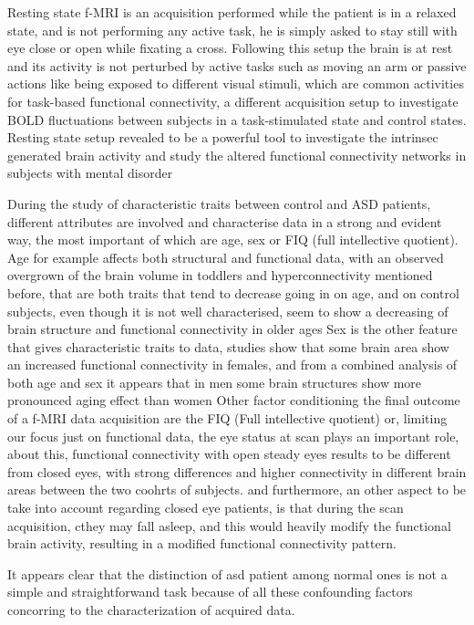 \documentclass[12pt]{report}
\begin{document}
Resting state f-MRI is an acquisition performed while the patient is in a relaxed state, and is not performing any active task, he is simply asked to stay still with eye close or open while fixating a cross.
Following this setup the brain is at rest and its activity is not perturbed by active tasks such as moving an arm or passive actions like being exposed to different visual stimuli, which are common activities for task-based functional connectivity, a different acquisition setup to investigate BOLD fluctuations between subjects in a task-stimulated state and control states.
Resting state setup revealed to be a powerful tool to investigate the intrinsec generated brain activity and study the altered functional connectivity networks in subjects with mental disorder


During the study of characteristic traits between control and ASD patients, different attributes are involved and characterise data in a strong and evident way, the most important of which are age, sex or FIQ (full intellective quotient).
Age for example affects both structural and functional data, with an observed overgrown of the brain volume in toddlers and hyperconnectivity mentioned before, that are both traits that tend to decrease going in on age, and on control subjects, even though it is not well characterised, seem to show a decreasing of brain structure and functional connectivity in older ages \cite{zhangC-2016}
Sex is the other feature that gives characteristic traits to data, studies show that some brain area show an increased functional connectivity in females, and from a combined analysis of both age and sex it appears that in men some brain structures show more pronounced aging effect than women
\cite{coffey-1998}
Other factor conditioning the final outcome of a f-MRI data acquisition are the FIQ (Full intellective quotient) or, limiting our focus just on functional data, the eye status at scan plays an important role, about this, functional connectivity with open steady eyes results to be different from closed eyes, with strong differences and higher connectivity in different brain areas between the two coohrts of subjects.
\cite{costumero-2020}
and furthermore, an other aspect to be take into account regarding closed eye patients, is that during the scan acquisition, cthey may fall asleep, and this would heavily modify the functional brain activity, resulting in a modified functional connectivity pattern.

It appears clear that the distinction of asd patient among normal ones is not a simple and straightforwand task because of all these confounding factors concorring to the characterization of acquired data.
\end{document}

